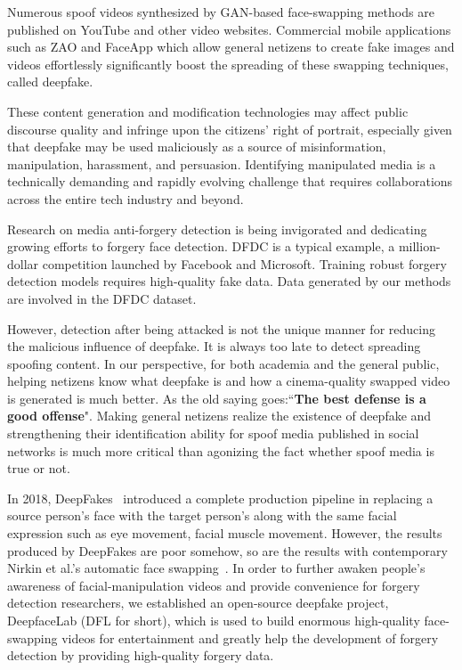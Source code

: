 \documentclass[10pt,twocolumn,letterpaper]{article}
\begin{document}
Numerous spoof videos synthesized by GAN-based face-swapping methods are published on YouTube and other video websites. Commercial mobile applications such as ZAO and FaceApp which allow general netizens to create fake images and videos effortlessly significantly boost the spreading of these swapping techniques, called deepfake.

These content generation and modification technologies
may affect public discourse quality and infringe upon the citizens' right of portrait, especially given that deepfake may be used maliciously as a source of misinformation, manipulation, harassment,
and persuasion. Identifying manipulated media is a technically demanding and rapidly evolving challenge that requires collaborations across the entire tech industry and beyond.

Research on media anti-forgery detection is being invigorated and dedicating growing efforts to forgery face detection. DFDC is a typical example, a million-dollar competition launched by Facebook and Microsoft. Training robust forgery detection models requires high-quality fake data. Data generated by our methods are involved in the DFDC dataset\cite{DFDC}.


However, detection after being attacked is not the unique manner for reducing the malicious influence of deepfake. It is always too late to detect spreading spoofing content. In our perspective, for both academia and the general public, helping netizens know what deepfake is and how a cinema-quality swapped video is generated is much better. 
As the old saying goes:``\textbf{The best defense is a good offense}".
Making general netizens realize the existence of deepfake and strengthening their identification ability for spoof media published in social networks is much more critical than agonizing the fact whether spoof media is true or not.

In 2018, DeepFakes~\cite{Deepfakes} introduced a complete production pipeline in replacing a source person's face with the target person's along with the same facial expression such as eye movement, facial muscle movement. However, the results produced by DeepFakes are poor somehow, so are the results with contemporary Nirkin et al.'s automatic face swapping~\cite{nirkin2018_faceswap}. In order to further awaken people's awareness of 
facial-manipulation videos and provide convenience for forgery detection researchers, we established an open-source deepfake project, DeepfaceLab (DFL for short), which is used to build enormous high-quality face-swapping videos for entertainment and greatly help the development of forgery detection by providing high-quality forgery data.
\end{document}
